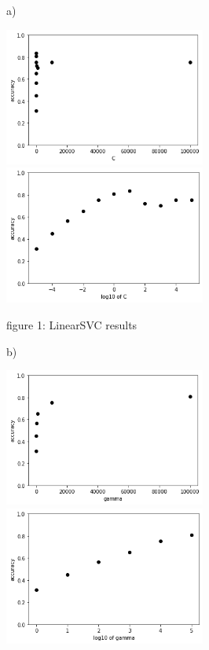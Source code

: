 \documentclass{homework}
\begin{document}
\exercise*
a)

\centering
\includegraphics[width=250]{2a.png}
\includegraphics[width=250]{2a2.png}

\caption{figure 1: LinearSVC results}

\raggedright


b)

\centering
\includegraphics[width=250]{2b.png}
\includegraphics[width=250]{2b2.png}
\end{document}

